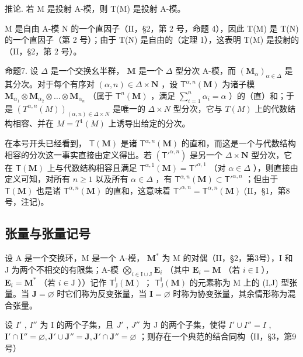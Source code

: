 推论. 若 M 是投射 A-模，则 T(M) 是投射 A-模。

M 是自由 A-模 N 的一个直因子（II，§2，第 2 号，命题 4），因此 T(M) 是 T(N) 的一个直因子（第 2 号）；由于 T(N) 是自由的（定理 1），这表明 T(M) 是投射的（II，§2，第 2 号）。

命题7. 设 \(\Delta\) 是一个交换幺半群， \(\mathbf{M}\) 是一个 \(\Delta\) 型分次 A-模，而 \((\mathbf{M}_{\alpha})_{\alpha \in \Delta}\) 是其分次。对于每个有序对 \((\alpha, n) \in \Delta \times \mathbf{N}\) ，设 \(\mathsf{T}^{\alpha,n}(\mathbf{M})\) 为诸子模 \(\mathbf{M}_{\alpha_1} \otimes \mathbf{M}_{\alpha_2} \otimes \dots \otimes \mathbf{M}_{\alpha_n}\) （属于 \(\mathsf{T}^n(\mathbf{M})\) ，满足 \(\sum_{i=1}^{n} \alpha_i = \alpha\) ）的（直）和；于是 \((T^{\alpha, n}(M))_{(\alpha, n) \in \Delta \times N}\) 是唯一的 \(\Delta \times N\) 型分次，它与 \(T(M)\) 上的代数结构相容、并在 \(M = T^1(M)\) 上诱导出给定的分次。

在本号开头已经看到， \(\mathsf{T}(\mathbf{M})\) 是诸 \(\mathsf{T}^{\alpha,n}(\mathbf{M})\) 的直和，而这是一个与代数结构相容的分次这一事实直接由定义得出。若 \((\mathsf{T}'^{\alpha,n})\) 是另一个 \(\Delta \times \mathbf{N}\) 型分次，它在 \(\mathsf{T}(\mathbf{M})\) 上与代数结构相容且满足 \(\mathsf{T}^{\alpha,1}(\mathbf{M}) = \mathsf{T}'^{\alpha,1}\) （对 \(\alpha \in \Delta\) ），则直接由定义可知，对所有 \(n \geqslant 1\) 以及所有 \(\alpha \in \Delta\) ，有 \(\mathsf{T}^{\alpha,n}(\mathbf{M}) \subset \mathsf{T}'^{\alpha,n}\) ；但由于 \(\mathsf{T}(\mathbf{M})\) 也是诸 \(\mathsf{T}^{\alpha,n}(\mathbf{M})\) 的直和，这意味着 \(\mathsf{T}'^{\alpha,n} = \mathsf{T}^{\alpha,n}(\mathbf{M})\) (II，§1，第8号，注记)。

\subsection{张量与张量记号}

设 A 是一个交换环，M 是一个 A-模， \(\mathbf{M}^*\) 为 M 的对偶（II，§2，第3号），I 和 J 为两个不相交的有限集；A-模 \(\bigotimes_{i\in \mathrm{I}\cup \mathrm{J}}\mathbf{E}_i\) （其中 \(\mathbf{E}_i = \mathbf{M}\) （若 \(i\in \mathrm{I}\) ）， \(\mathbf{E}_i = \mathbf{M}^*\) （若 \(i\in \mathrm{J}\) ））记作 \(\mathsf{T}_{\mathsf{J}}^{\mathsf{I}}(\mathbf{M})\) ； \(\mathsf{T}_{\mathsf{J}}^{\mathsf{I}}(\mathbf{M})\) 的元素称为 M 上的 (I,J) 型张量。当 \(\mathbf{J} = \varnothing\) 时它们称为反变张量，当 \(\mathbf{I} = \varnothing\) 时称为协变张量，其余情形称为混合张量。

设 \(I'\) , \(I''\) 为 I 的两个子集，且 \(J'\) , \(J''\) 为 J 的两个子集，使得 \(I' \cup I'' = I\) , \(\mathbf{I}' \cap \mathbf{I}'' = \varnothing, \mathbf{J}' \cup \mathbf{J}'' = \mathbf{J}, \mathbf{J}' \cap \mathbf{J}'' = \varnothing\) ；则存在一个典范的结合同构（II，§3，第9号）

